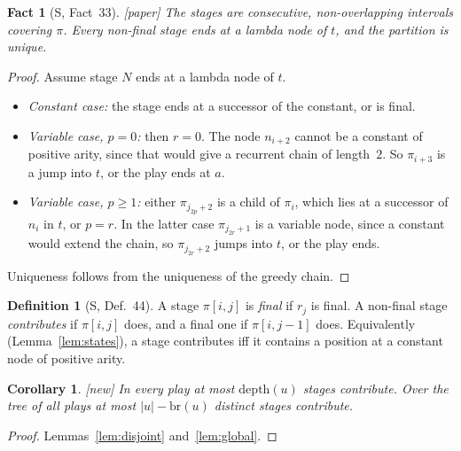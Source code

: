 \documentclass[11pt]{article}
\newcommand{\depth}{\mathrm{depth}}
\newcommand{\br}{\mathrm{br}}
\newcommand{\iv}[2]{\pi[#1,#2]}
\newcommand{\Paper}{\textsf{[paper]}}
\newcommand{\New}{\textsf{[new]}}
\theoremstyle{plain}
\newtheorem{corollary}[theorem]{Corollary}
\newtheorem{fact}[theorem]{Fact}
\theoremstyle{definition}
\newtheorem{definition}[theorem]{Definition}
\theoremstyle{remark}
\begin{document}
\begin{fact}[S, Fact~33]\label{fact:33}
\Paper{} The stages are consecutive, non-overlapping intervals covering
$\pi$.  Every non-final stage ends at a lambda node of $t$, and the
partition is unique.
\end{fact}
\begin{proof}
Assume stage $N$ ends at a lambda node of $t$.
\begin{itemize}
\item \emph{Constant case:} the stage ends at a successor of the
  constant, or is final.
\item \emph{Variable case, $p=0$:} then $r=0$.  The node $n_{i+2}$ cannot
  be a constant of positive arity, since that would give a recurrent
  chain of length~$2$.  So $\pi_{i+3}$ is a jump into $t$, or the play
  ends at $a$.
\item \emph{Variable case, $p\ge1$:} either $\pi_{j_{2p}+2}$ is a child of
  $\pi_i$, which lies at a successor of $n_i$ in $t$, or $p=r$.  In the
  latter case $\pi_{j_{2r}+1}$ is a variable node, since a constant would
  extend the chain, so $\pi_{j_{2r}+2}$ jumps into $t$, or the play ends.
\end{itemize}
Uniqueness follows from the uniqueness of the greedy chain.
\end{proof}

\begin{definition}[S, Def.~44]
A stage $\iv ij$ is \emph{final} if $r_j$ is final.  A non-final stage
\emph{contributes} if $\iv ij$ does, and a final one if $\iv i{j-1}$
does.  Equivalently (Lemma~\ref{lem:states}), a stage contributes iff
it contains a position at a constant node of positive arity.
\end{definition}

\begin{corollary}\label{cor:contrib-stages}
\New{} In every play at most $\depth(u)$ stages contribute.  Over the
tree of all plays at most $|u|-\br(u)$ distinct stages contribute.
\end{corollary}
\begin{proof}
Lemmas~\ref{lem:disjoint} and~\ref{lem:global}.
\end{proof}
\end{document}
